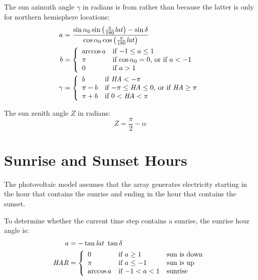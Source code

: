 \documentclass[12pt,letterpaper]{article}
\begin{document}
The sun azimuth angle $\gamma$ in radians is from \citep{iqbal1983} rather than \citep{michalsky1988} because the latter is only for northern hemisphere locations:
\begin{align}\label{eqn-solaraz}
a &= \frac{\sin\alpha_0 \sin\left(\frac{\pi}{180}\mathit{lat}\right) - \sin\delta}{\cos\alpha_0 \cos\left(\frac{\pi}{180}\mathit{lat}\right)}\notag\\
b &= \left\{
\begin{array}{ll}
\arccos a & \text{if $-1 \leq a \leq 1$}\\
\pi & \text{if $\cos\alpha_0=0$, or if $a < -1$}\\
0 & \text{if $a > 1$}
\end{array}
\right.\notag\\
\gamma &= \left\{
\begin{array}{ll}
b & \text{if $\mathit{HA} < -\pi$}\\
\pi - b & \text{if $-\pi \leq \mathit{HA} \leq 0$, or if $\mathit{HA} \geq \pi$}\\
\pi + b & \text{if $0 < \mathit{HA} < \pi$}
\end{array}
\right.
\end{align}

The sun zenith angle $Z$ in radians:
\begin{equation}\label{eqn-zen}
Z = \frac{\pi}{2}-\alpha
\end{equation}

\section{Sunrise and Sunset Hours}\label{sec-sunriseset}

The photovoltaic model assumes that the array generates electricity starting in the hour that contains the sunrise and ending in the hour that contains the sunset.

To determine whether the current time step contains a sunrise, the sunrise hour angle is:
\begin{align}\label{eqn-sunriseha}
a &= -\tan \mathit{lat}~\tan\delta\notag\\
\mathit{HAR} &= 
\left\{
   \begin{array}{lll}
      0 & \text{if $a\geq1$} & \text{sun is down}\\
      \pi & \text{if $a\leq-1$} & \text{sun is up}\\
      \arccos a & \text{if $-1<a<1$} & \text{sunrise}
   \end{array}
\right. 
\end{align}
\end{document}
